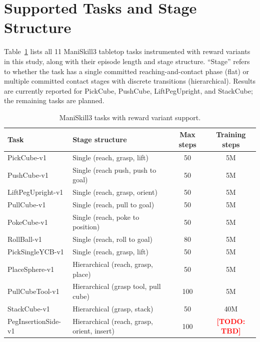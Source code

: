 \documentclass{article}
\newcommand{\todo}[1]{\textcolor{red}{\textbf{[TODO: #1]}}}
\begin{document}


\appendix

\section{Supported Tasks and Stage Structure}
\label{app:tasks}

Table~\ref{tab:tasks} lists all 11 ManiSkill3 tabletop tasks instrumented with
reward variants in this study, along with their episode length and stage structure.
``Stage'' refers to whether the task has a single committed reaching-and-contact phase
(flat) or multiple committed contact stages with discrete transitions (hierarchical).
Results are currently reported for PickCube, PushCube, LiftPegUpright, and StackCube;
the remaining tasks are planned.

\begin{table}[h]
\centering
\small
\caption{ManiSkill3 tasks with reward variant support.}
\label{tab:tasks}
\begin{tabular}{@{}llcc@{}}
\toprule
\textbf{Task} & \textbf{Stage structure} & \textbf{Max steps} & \textbf{Training steps} \\
\midrule
PickCube-v1        & Single (reach, grasp, lift)      & 50  & 5M  \\
PushCube-v1        & Single (reach push, push to goal) & 50  & 5M  \\
LiftPegUpright-v1  & Single (reach, grasp, orient)    & 50  & 5M  \\
PullCube-v1        & Single (reach, pull to goal)     & 50  & 5M  \\
PokeCube-v1        & Single (reach, poke to position) & 50  & 5M  \\
RollBall-v1        & Single (reach, roll to goal)     & 80  & 5M  \\
PickSingleYCB-v1   & Single (reach, grasp, lift)      & 50  & 5M  \\
\midrule
PlaceSphere-v1     & Hierarchical (reach, grasp, place) & 50 & 5M  \\
PullCubeTool-v1    & Hierarchical (grasp tool, pull cube) & 100 & 5M \\
StackCube-v1       & Hierarchical (grasp, stack)      & 50  & 40M \\
PegInsertionSide-v1 & Hierarchical (reach, grasp, orient, insert) & 100 & \todo{TBD} \\
\bottomrule
\end{tabular}
\end{table}
\end{document}

